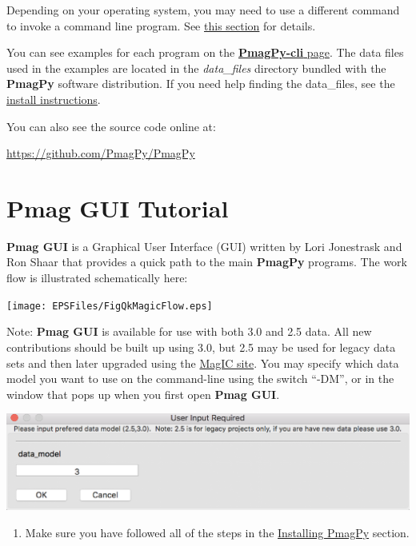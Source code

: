 \documentclass[11pt]{book}
\begin{document}
{{Depending on your operating system, you  may need to use a different command to invoke a command line program.  See \href{#which_command}{this section} for details.

You can see examples for each program on the \href{http://pmagpy.github.io/PmagPy-cli.html}{{\bf PmagPy-cli} page}. The data files used in the examples are located in the {\it data\_files} directory bundled with the {\bf PmagPy} software distribution.  If you need help finding the data\_files, see the \href{#getting_python}{install instructions}.

You can also see the source code online at:


 \url{https://github.com/PmagPy/PmagPy}



\chapter{Pmag GUI Tutorial}
\label{chap:Pmag GUI}

{\bf Pmag GUI} is a Graphical User Interface (GUI) written by Lori Jonestrask and Ron Shaar  that provides a quick path to the main {\bf PmagPy} programs. The work flow is illustrated schematically here:

\texttt{[image: EPSFiles/FigQkMagicFlow.eps]}

Note: {\bf Pmag GUI} is available for use with both 3.0 and 2.5 data.  All new contributions should be built up using 3.0, but 2.5 may be used for legacy data sets and then later upgraded using the \href{https://www.earthref.org/MagIC/upgrade}{MagIC site}.  You may specify which data model you want to use on the command-line using the switch ``-DM'', or in the window that pops up when you first open {\bf Pmag GUI}.

\includegraphics[width=6in]{EPSFiles/PmagGUI_choose_data_model.eps}

\begin{enumerate}
\item Make sure you have followed all of the steps in the \href{#quick_start}{Installing PmagPy} section.


\end{enumerate}}}
\end{document}
